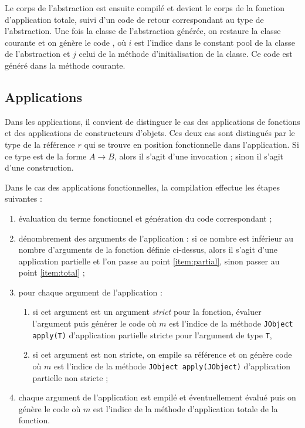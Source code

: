 Le corps de l'abstraction est ensuite compil\'e et devient le corps de
la fonction d'application totale, suivi d'un code de retour
 correspondant au type de l'abstraction. Une
fois la classe de l'abstraction g\'en\'er\'ee, on restaure la classe
courante et on g\'en\`ere le code , o\`u $i$ est l'indice dans le
constant pool de la classe de l'abstraction et $j$ celui de la m\'ethode
d'initialisation de la classe. Ce code est g\'en\'er\'e dans la m\'ethode
courante. 

\subsection{Applications}

Dans les applications, il convient de distinguer le cas des
applications de fonctions et des applications de constructeurs
d'objets. Ces deux cas sont distingu\'es par le type de la r\'ef\'erence $r$
qui se trouve en position fonctionnelle dans l'application. Si ce type
est de la forme $A\rightarrow B$, alors il s'agit d'une invocation ;
sinon il s'agit d'une construction.

Dans le cas des applications fonctionnelles, la compilation effectue
les \'etapes suivantes :
\begin{enumerate}
  \item \'evaluation du terme fonctionnel et g\'en\'eration du code
    correspondant ; 
  \item d\'enombrement des arguments de l'application : si ce nombre est
    inf\'erieur au nombre d'arguments de la fonction d\'efinie ci-dessus,
    alors il s'agit d'une application partielle et l'on passe au point
    \ref{item:partial}, sinon passer au point \ref{item:total} ;
  \item \label{item:partial} pour chaque argument de l'application :
    \begin{enumerate}
      \item si cet argument est un argument \emph{strict} pour la
        fonction, \'evaluer l'argument puis g\'en\'erer le code
         o\`u $m$ est l'indice de la
        m\'ethode \texttt{JObject apply(T)} d'application partielle
        stricte pour l'argument de type \texttt{T},
      \item si cet argument est non stricte, on empile sa r\'ef\'erence
        et on g\'en\`ere code  o\`u $m$ est l'indice de la
        m\'ethode \texttt{JObject apply(JObject)} d'application partielle
        non stricte ;
    \end{enumerate}
  \item \label{item:total} chaque argument de l'application est empil\'e
    et \'eventuellement \'evalu\'e puis on g\'en\`ere le code  o\`u $m$ est l'indice de la
        m\'ethode d'application totale de la fonction. 
\end{enumerate}

